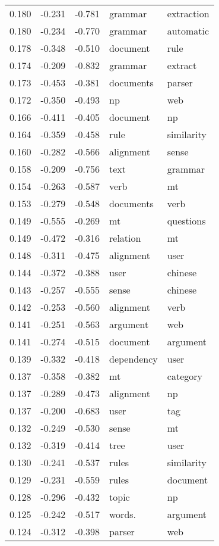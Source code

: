 \begin{tabular}{cccp{5cm}p{5cm}}
0.180 & -0.231 & -0.781 & grammar & extraction \\
0.180 & -0.234 & -0.770 & grammar & automatic \\
0.178 & -0.348 & -0.510 & document & rule \\
0.174 & -0.209 & -0.832 & grammar & extract \\
0.173 & -0.453 & -0.381 & documents & parser \\
0.172 & -0.350 & -0.493 & np & web \\
0.166 & -0.411 & -0.405 & document & np \\
0.164 & -0.359 & -0.458 & rule & similarity \\
0.160 & -0.282 & -0.566 & alignment & sense \\
0.158 & -0.209 & -0.756 & text & grammar \\
0.154 & -0.263 & -0.587 & verb & mt \\
0.153 & -0.279 & -0.548 & documents & verb \\
0.149 & -0.555 & -0.269 & mt & questions \\
0.149 & -0.472 & -0.316 & relation & mt \\
0.148 & -0.311 & -0.475 & alignment & user \\
0.144 & -0.372 & -0.388 & user & chinese \\
0.143 & -0.257 & -0.555 & sense & chinese \\
0.142 & -0.253 & -0.560 & alignment & verb \\
0.141 & -0.251 & -0.563 & argument & web \\
0.141 & -0.274 & -0.515 & document & argument \\
0.139 & -0.332 & -0.418 & dependency & user \\
0.137 & -0.358 & -0.382 & mt & category \\
0.137 & -0.289 & -0.473 & alignment & np \\
0.137 & -0.200 & -0.683 & user & tag \\
0.132 & -0.249 & -0.530 & sense & mt \\
0.132 & -0.319 & -0.414 & tree & user \\
0.130 & -0.241 & -0.537 & rules & similarity \\
0.129 & -0.231 & -0.559 & rules & document \\
0.128 & -0.296 & -0.432 & topic & np \\
0.125 & -0.242 & -0.517 & words. & argument \\
0.124 & -0.312 & -0.398 & parser & web \\

\end{tabular}

